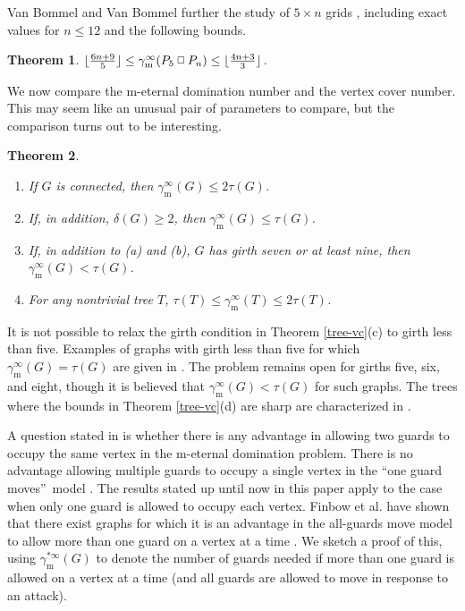 \documentclass[12pt]{article}%
\newtheorem{theorem}{Theorem}[section]
\providecommand{\boksie}{\ensuremath{\mathbin{\raisebox{0.3mm}{$\scriptstyle\square$}}}}
\begin{document}
Van Bommel and Van Bommel further the study of $5\times n$ grids \cite{vb},
including exact values for $n\leq12$ and the following bounds.

\begin{theorem}
\emph{\cite{vb}} $\lfloor\frac{6n+9}{5}\rfloor\leq\gamma_{\mathrm{m}}^{\infty
}(P_{5}\boksie P_{n})\leq\lfloor\frac{4n+3}{3}\rfloor$.
\end{theorem}

We now compare the m-eternal domination number and the vertex cover number.
This may seem like an unusual pair of parameters to compare, but the
comparison turns out to be interesting.

\begin{theorem}
\label{gammavc}\label{tree-vc}

\begin{enumerate}
\item[\emph{(a)}] \emph{\cite{KMDM}\hspace{0.1in}}If $G$ is connected, then
$\gamma_{\mathrm{m}}^{\infty}(G)\leq2\tau(G)$.

\item[\emph{(b)}] \emph{\cite{KMDM}\hspace{0.1in}}If, in addition,
$\delta(G)\geq2$, then $\gamma_{\mathrm{m}}^{\infty}(G)\leq\tau(G)$.

\item[\emph{(c)}] \emph{\cite{KM6}\hspace{0.1in}}If, in addition to (a) and
(b), $G$ has girth seven or at least nine, then $\gamma_{\mathrm{m}}^{\infty
}(G)<\tau(G)$.

\item[\emph{(d)}] \emph{\cite{KM6}\hspace{0.1in}}For any nontrivial tree $T$,
$\tau(T)\leq\gamma_{\mathrm{m}}^{\infty}(T)\leq2\tau(T)$.
\end{enumerate}
\end{theorem}

It is not possible to relax the girth condition in Theorem \ref{tree-vc}(c) to
girth less than five. Examples of graphs with girth less than five for which
$\gamma_{\mathrm{m}}^{\infty}(G)=\tau(G)$ are given in \cite{KM6}. The problem
remains open for girths five, six, and eight, though it is believed that
$\gamma_{\mathrm{m}}^{\infty}(G)<\tau(G)$ for such graphs. The trees where the
bounds in Theorem \ref{tree-vc}(d) are sharp are characterized in \cite{KM6}.

A question stated in \cite{GHH} is whether there is any advantage in allowing
two guards to occupy the same vertex in the m-eternal domination problem.
There is no advantage allowing multiple guards to occupy a single vertex in
the \textquotedblleft one guard moves\textquotedblright\ model \cite{BCG2}.
The results stated up until now in this paper apply to the case when only one
guard is allowed to occupy each vertex. Finbow et al. have shown that there
exist graphs for which it is an advantage in the all-guards move model to
allow more than one guard on a vertex at a time \cite{FG}. We sketch a proof
of this, using $\gamma_{\mathrm{m}}^{*\infty}(G)$ to denote the number of
guards needed if more than one guard is allowed on a vertex at a time (and all
guards are allowed to move in response to an attack).
\end{document}
